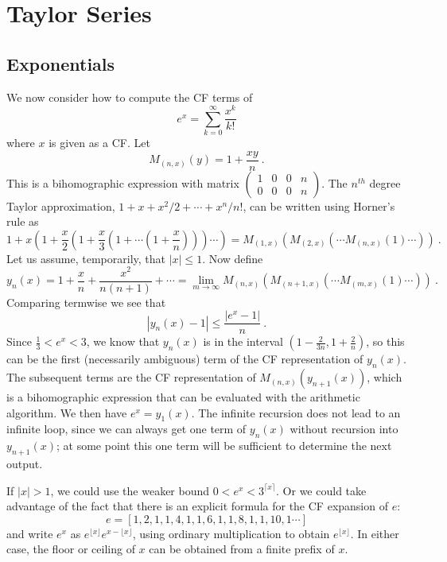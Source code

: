 \documentclass[11pt, oneside]{amsart}   	%
\newcommand{\bihomographic}[8]{\left(\begin{smallmatrix}#1&#2&#3&#4\\#5&#6&#7&#8\end{smallmatrix}\right)}
\renewcommand{\:}{\negthickspace:\negthickspace}
\begin{document}
\section{Taylor Series}
\subsection{Exponentials} We now consider how to compute the CF terms of 
\[
e^x = \sum_{k=0}^{\infty} \frac{x^k}{k!}
\]
where $x$ is given as a CF. Let
\[
M_{(n,x)}(y) = 1 + \frac{xy}{n} \ .
\]
This is a bihomographic expression with matrix $\bihomographic{1}{0}{0}{n}{0}{0}{0}{n}$. The $n^{th}$ degree Taylor approximation,
$1 + x + x^2/2 +\cdots + x^n/{n!}$, can be written using Horner's rule as
\[
 1 + x \left(1 + \frac{x}{2}\left( 1 + \frac{x}{3}\left(1 + \cdots \left(1 + \frac{x}{n}\right)\right)\right) \cdots \right) = M_{(1,x)}( M_{(2,x)}( \cdots M_{(n,x)}(1) \cdots ) ) \ . \]
 Let us assume, temporarily, that $|x| \leq 1$. Now define
 \[
 y_n(x) = 1 + \frac{x}{n} + \frac{x^2}{n(n+1)} + \cdots = \lim_{m\to\infty} M_{(n,x)}( M_{(n+1,x)}( \cdots M_{(m,x)}(1) \cdots ) ) \ .
  \]
 Comparing termwise we see that
 \[
 |y_n(x) - 1| \leq \frac{|e^x - 1|}{n} \ .
 \]
Since $\frac{1}{3} < e^x < 3$, we know that $y_n(x)$ is in the interval $(1 - \frac{2}{3n}, 1 + \frac{2}{n})$, so this can be the first (necessarily ambiguous) term of the CF representation of $y_n(x)$.
The subsequent terms are the CF representation of $M_{(n,x)}(y_{n+1}(x))$, which is a bihomographic expression that can be evaluated with the arithmetic algorithm. We then have $e^x = y_1(x)$. The infinite recursion does not lead to an infinite loop, since we can always get one term of $y_n(x)$ without recursion into $y_{n+1}(x)$; at some point this one term will be sufficient to determine the next output.

If $|x|>1$, we could use the weaker bound $0 < e^x < 3^{\lceil x \rceil}$. Or we could take advantage of the fact that there is an explicit formula for the CF expansion of $e$:
\[
e = [1,2,1,1,4,1,1,6,1,1,8,1,1,10,1 \cdots ]
\]
and write $e^x$ as $e^{\lfloor x \rfloor}e^{x-\lfloor x \rfloor}$, using ordinary multiplication to obtain $e^{\lfloor x \rfloor}$. In either case, the floor or ceiling of $x$ can be obtained from a finite prefix of $x$.
\end{document}
